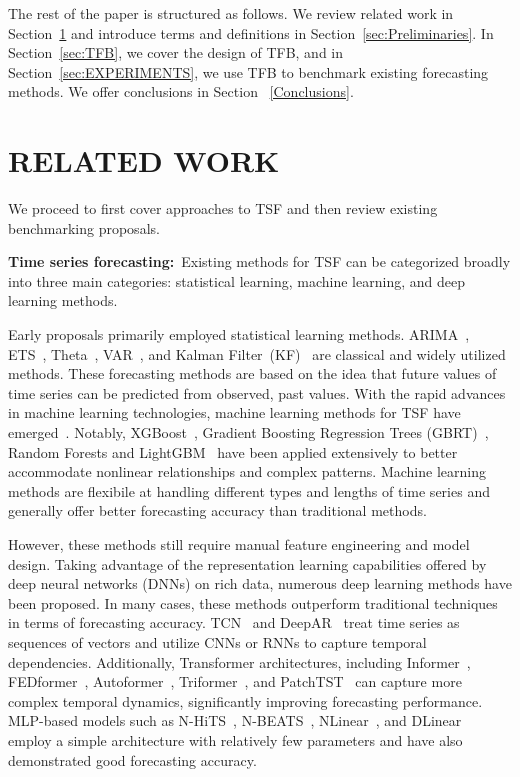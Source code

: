 \documentclass[sigconf, nonacm, pdfa]{acmart}
\begin{document}
The rest of the paper is structured as follows. We review related work in Section~\ref{sec:RELATED WORK} and introduce terms and definitions in Section~\ref{sec:Preliminaries}. In Section~\ref{sec:TFB}, we cover the design of TFB, and in Section~\ref{sec:EXPERIMENTS}, we use TFB to benchmark existing forecasting methods. We offer conclusions in Section ~\ref{Conclusions}.



\section{RELATED WORK}
\label{sec:RELATED WORK}


We proceed to first cover approaches to TSF and then review existing benchmarking proposals.


\noindent
\textbf{Time series forecasting:}~Existing methods for TSF can be categorized broadly into three main categories: statistical learning, machine learning, and deep learning methods.

Early proposals primarily employed statistical learning methods. ARIMA~\cite{box1970distribution}, ETS~\cite{hyndman2008forecasting}, Theta~\cite{garza2022statsforecast}, VAR~\cite{toda1994vector}, and Kalman Filter~(KF)~\cite{harvey1990forecasting} are classical and widely utilized methods. These forecasting methods are based on the idea that future values of time series can be predicted from observed, past values. With the rapid advances in machine learning technologies, machine learning methods for TSF have emerged~\cite{fischer2020machine}. Notably, XGBoost~\cite{chen2016xgboost,zhang2021time}, Gradient Boosting Regression Trees (GBRT)~\cite{friedman2001greedy}, Random Forests\cite{breiman2001random, mei2014random} and LightGBM~\cite{ke2017lightgbm} have been applied extensively to better accommodate nonlinear relationships and complex patterns. 
Machine learning methods are flexibile at handling different types and lengths of time series and generally offer better forecasting accuracy than traditional methods.

However, these methods still require manual feature engineering and model design. Taking advantage of the representation learning capabilities offered by deep neural networks (DNNs) on rich data, numerous deep learning methods have been proposed. In many cases, these methods outperform traditional techniques in terms of forecasting accuracy. TCN~\cite{bai2018empirical} and DeepAR~\cite{salinas2020deepar} treat time series as sequences of vectors and utilize CNNs or RNNs to capture temporal dependencies. Additionally, Transformer architectures, including Informer~\cite{zhou2021informer}, FEDformer~\cite{zhou2022fedformer}, Autoformer~\cite{wu2021autoformer}, Triformer~\cite{cirstea2022triformer}, and PatchTST~\cite{nie2022time} can capture more complex temporal dynamics, significantly improving forecasting performance. MLP-based models such as N-HiTS~\cite{challu2023nhits}, N-BEATS~\cite{oreshkin2019n}, NLinear~\cite{zeng2023transformers}, and DLinear~\cite{zeng2023transformers} employ a simple architecture with relatively few parameters and have also demonstrated good forecasting accuracy.
\end{document}
